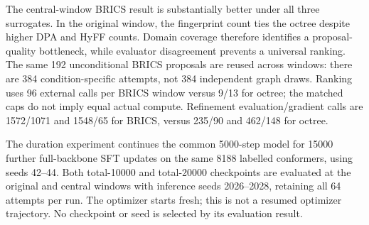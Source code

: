 \documentclass[11pt,a4paper]{article}
\begin{document}
The central-window BRICS result is substantially better under all three
surrogates. In the original window, the fingerprint count ties the
octree despite higher DPA and HyFF counts. Domain coverage therefore
identifies a proposal-quality bottleneck, while evaluator disagreement
prevents a universal ranking. The same 192 unconditional BRICS proposals
are reused across windows: there are 384 condition-specific attempts,
not 384 independent graph draws. Ranking uses 96 external calls per
BRICS window versus 9/13 for octree; the matched caps do not imply equal
actual compute. Refinement evaluation/gradient calls are 1572/1071 and
1548/65 for BRICS, versus 235/90 and 462/148 for octree.

The duration experiment continues the common 5000-step model for 15000
further full-backbone SFT updates on the same 8188 labelled conformers,
using seeds 42--44. Both total-10000 and total-20000 checkpoints are
evaluated at the original and central windows with inference seeds
2026--2028, retaining all 64 attempts per run. The optimizer starts
fresh; this is not a resumed optimizer trajectory. No checkpoint or seed
is selected by its evaluation result.
\end{document}

